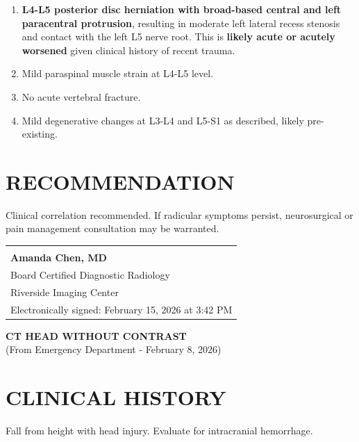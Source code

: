 \documentclass[11pt]{article}
\begin{document}
\begin{enumerate}
\item \textbf{L4-L5 posterior disc herniation with broad-based central and left paracentral protrusion}, resulting in moderate left lateral recess stenosis and contact with the left L5 nerve root. This is \textbf{likely acute or acutely worsened} given clinical history of recent trauma.

\item Mild paraspinal muscle strain at L4-L5 level.

\item No acute vertebral fracture.

\item Mild degenerative changes at L3-L4 and L5-S1 as described, likely pre-existing.
\end{enumerate}

\section*{RECOMMENDATION}

Clinical correlation recommended. If radicular symptoms persist, neurosurgical or pain management consultation may be warranted.

\vspace{2em}

\begin{tabular}{@{}p{10cm}@{}}
\hrulefill \\
\textbf{Amanda Chen, MD} \\
Board Certified Diagnostic Radiology \\
Riverside Imaging Center \\
Electronically signed: February 15, 2026 at 3:42 PM \\
\end{tabular}

\newpage

\begin{center}
{\Large\bfseries CT HEAD WITHOUT CONTRAST}\\
{\normalsize (From Emergency Department - February 8, 2026)}
\end{center}

\vspace{1em}

\section*{CLINICAL HISTORY}

Fall from height with head injury. Evaluate for intracranial hemorrhage.
\end{document}
